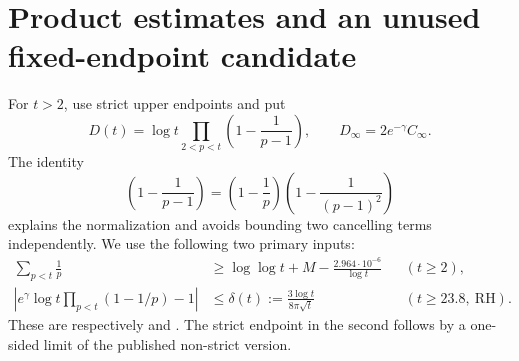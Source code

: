 \documentclass[11pt]{article}
\begin{document}
\section{Product estimates and an unused fixed-endpoint candidate}
For $t>2$, use strict upper endpoints and put
\[
D(t)=\log t\prod_{2<p<t}\left(1-\frac1{p-1}\right),\qquad
D_\infty=2e^{-\gamma}C_\infty.
\]
The identity
\[
\left(1-\frac1{p-1}\right)
=\left(1-\frac1p\right)\left(1-\frac1{(p-1)^2}\right)
\]
explains the normalization and avoids bounding two cancelling terms
independently. We use the following two primary inputs:
\begin{align}
\sum_{p<t}\frac1p&\ge\log\log t+M-\frac{2.964\cdot10^{-6}}{\log t}
&& (t\ge2),\label{eq:recip}\\
\left|e^\gamma\log t\prod_{p<t}(1-1/p)-1\right|
&\le\delta(t):=\frac{3\log t}{8\pi\sqrt t}
&& (t\ge23.8,\ \mathrm{RH}).\label{eq:mertens}
\end{align}
These are respectively \cite[Lemma 3.2]{JS} and
\cite[Corollary 1.3]{LN}. The strict endpoint in the second follows
by a one-sided limit of the published non-strict version.
\end{document}
